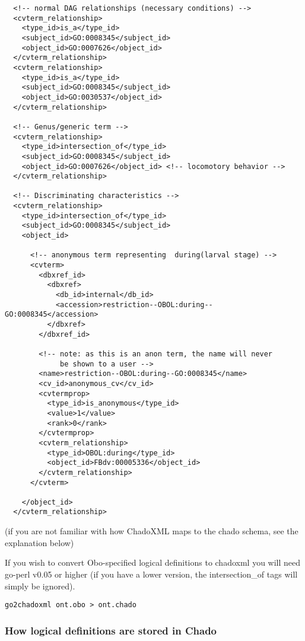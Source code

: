 \begin{verbatim}
  <!-- normal DAG relationships (necessary conditions) -->
  <cvterm_relationship>
    <type_id>is_a</type_id>
    <subject_id>GO:0008345</subject_id>
    <object_id>GO:0007626</object_id>
  </cvterm_relationship>
  <cvterm_relationship>
    <type_id>is_a</type_id>
    <subject_id>GO:0008345</subject_id>
    <object_id>GO:0030537</object_id>
  </cvterm_relationship>

  <!-- Genus/generic term -->
  <cvterm_relationship>
    <type_id>intersection_of</type_id>
    <subject_id>GO:0008345</subject_id>
    <object_id>GO:0007626</object_id> <!-- locomotory behavior -->
  </cvterm_relationship>

  <!-- Discriminating characteristics -->
  <cvterm_relationship>
    <type_id>intersection_of</type_id>
    <subject_id>GO:0008345</subject_id>
    <object_id>

      <!-- anonymous term representing  during(larval stage) -->
      <cvterm>
        <dbxref_id>
          <dbxref>
            <db_id>internal</db_id>
            <accession>restriction--OBOL:during--GO:0008345</accession>
          </dbxref>
        </dbxref_id>

        <!-- note: as this is an anon term, the name will never
             be shown to a user -->
        <name>restriction--OBOL:during--GO:0008345</name>
        <cv_id>anonymous_cv</cv_id>
        <cvtermprop>
          <type_id>is_anonymous</type_id>
          <value>1</value>
          <rank>0</rank>
        </cvtermprop>
        <cvterm_relationship>
          <type_id>OBOL:during</type_id>
          <object_id>FBdv:00005336</object_id>
        </cvterm_relationship>
      </cvterm>

    </object_id>
  </cvterm_relationship>

\end{verbatim}

(if you are not familiar with how ChadoXML maps to the chado schema,
see the explanation below)

If you wish to convert Obo-specified logical definitions to chadoxml
you will need go-perl v0.05 or higher (if you have a lower version,
the intersection\_of tags will simply be ignored).

\begin{verbatim}
go2chadoxml ont.obo > ont.chado
\end{verbatim}

\subsubsection{How logical definitions are stored in Chado}


